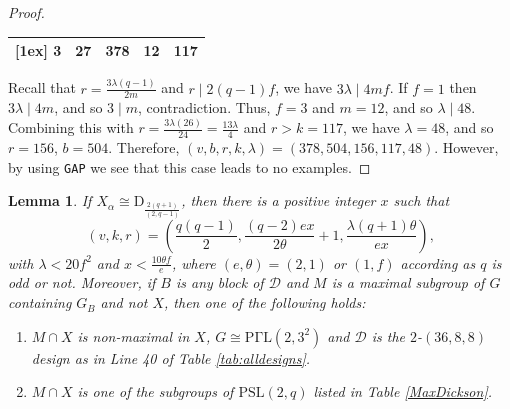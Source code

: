 \documentclass[a4paper,twopage,reqno,12pt]{amsart}
\newtheorem{lemma}[theorem]{Lemma}
\theoremstyle{definition}
\numberwithin{equation}{section}
\newcommand{\PSL}{\mathrm{PSL}}
\newcommand{\PGaL}{\mathrm{P\Gamma L}}
\newcommand{\D}{\mathrm{D}}
\begin{document}
\begin{proof}
\begin{table}[htbp]
\begin{tabular}{ccccc}
        [1ex]
        3 & 27 & 378 & 12 & 117 \\
        \bottomrule
    \end{tabular}
\end{table}
Recall that $r=\frac{3\lambda(q-1)}{2m}$ and $r\mid 2(q-1)f$,
we have $3\lambda \mid 4mf$. If $f=1$ then $3\lambda \mid 4m$, and so $3\mid m$, contradiction.
Thus, $f=3$ and $m=12$, and so $\lambda \mid 48$.
Combining this with $r= \frac{3\lambda(26)}{24} = \frac{13\lambda}{4}$ and $r>k=117$,
we have $\lambda=48$, and so $r=156$, $b=504$.
Therefore, $(v,b,r,k,\lambda)=(378,504,156,117,48)$. However, by using \texttt{GAP} we see that this case leads to no examples.
\end{proof}

\bigskip


\begin{lemma}\label{case8} If $X_{\alpha }$\bigskip $\cong \D_{\frac{2(q+1)}{(2,q-1)}}$, then there is a positive integer $x$ such that
$$
\left(v,k,r\right)=\left(\frac{q(q-1)}{2},\frac{(q-2)ex}{2\theta}+1,\frac{\lambda (q+1)\theta }{ex}\right)\text{,}  
$$
with $\lambda <20f^{2}$ and $x<\frac{10 \theta f}{e}$, where $(e,\theta )=(2,1)$ or $(1,f)$ according as $q$ is odd or not. Moreover, if $B$ is any block of $\mathcal{D}$ and 
$M$ is a maximal subgroup of $G$ containing $G_{B}$ and not $X$, then one of the following holds:
\begin{enumerate}
    \item $M\cap X$ is non-maximal in $X$, $G \cong \PGaL(2,3^{2})$ and $\mathcal{D}$ is the $2$-$(36,8,8)$ design as in Line 40 of Table \ref{tab:alldesigns}.
    \item $M\cap X$ is one of the subgroups of $\PSL(2,q)$ listed in Table \ref{MaxDickson}.
\end{enumerate}
\end{lemma}
\end{document}
